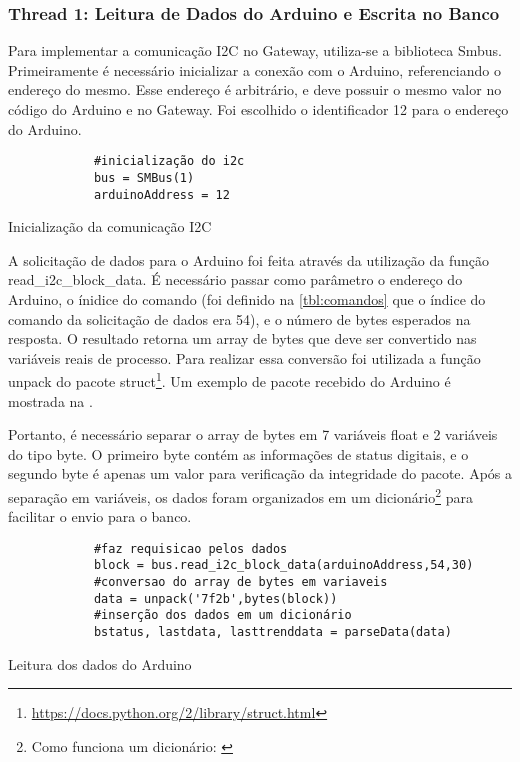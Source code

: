 		\subsubsection{Thread 1: Leitura de Dados do Arduino e Escrita no Banco}
		Para implementar a comunicação I2C no Gateway, utiliza-se a biblioteca Smbus. Primeiramente é necessário inicializar a conexão com o Arduino, referenciando o endereço do mesmo. Esse endereço é arbitrário, e deve possuir o mesmo valor no código do Arduino e no Gateway. Foi escolhido o identificador 12 para o endereço do Arduino.
		
		\begin{listing}[!htb]
			\begin{verbatim}
			#inicialização do i2c
			bus = SMBus(1)
			arduinoAddress = 12				
			\end{verbatim}
			\caption{Inicialização da comunicação I2C}
			\label{cod:starti2c}
		\end{listing}
		
		A solicitação de dados para o Arduino foi feita através da utilização da função read\_i2c\_block\_data. É necessário passar como parâmetro o endereço do Arduino, o ínidice do comando (foi definido na \autoref{tbl:comandos} que o índice do comando da solicitação de dados era 54), e o número de bytes esperados na resposta. O resultado retorna um array de bytes que deve ser convertido nas variáveis reais de processo. Para realizar essa conversão foi utilizada a função unpack do pacote struct\footnote{\url{https://docs.python.org/2/library/struct.html}}. Um exemplo de pacote recebido do Arduino é mostrada na .
		
		Portanto, é necessário separar o array de bytes em 7 variáveis float e 2 variáveis do tipo byte. O primeiro byte contém as informações de status digitais, e o segundo byte é apenas um valor para verificação da integridade do pacote. Após a separação em variáveis, os dados foram organizados em um dicionário\footnote{Como funciona um dicionário: \cite{mark2013}} para facilitar o envio para o banco.
		
		\begin{listing}[!htb]
			\begin{verbatim}
			#faz requisicao pelos dados
			block = bus.read_i2c_block_data(arduinoAddress,54,30)
			#conversao do array de bytes em variaveis
			data = unpack('7f2b',bytes(block))
			#inserção dos dados em um dicionário
			bstatus, lastdata, lasttrenddata = parseData(data)			
			\end{verbatim}
			\caption{Leitura dos dados do Arduino}
			\label{cod:read_arduino}
		\end{listing}
		
